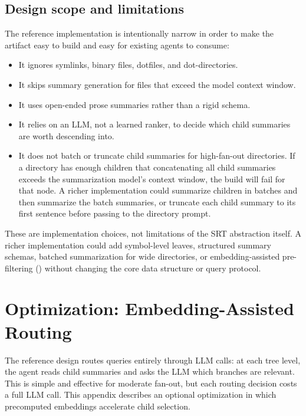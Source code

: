 \documentclass[11pt,a4paper]{article}
\newcommand{\srt}{\textsc{SRT}}
\begin{document}
\subsection{Design scope and limitations}\label{app:limits}

The reference implementation is intentionally narrow in order to make the artifact easy to build and easy for existing agents to consume:
\begin{itemize}[nosep]
    \item It ignores symlinks, binary files, dotfiles, and dot-directories.
    \item It skips summary generation for files that exceed the model context window.
    \item It uses open-ended prose summaries rather than a rigid schema.
    \item It relies on an LLM, not a learned ranker, to decide which child summaries are worth descending into.
    \item It does not batch or truncate child summaries for high-fan-out directories. If a directory has enough children that concatenating all child summaries exceeds the summarization model's context window, the build will fail for that node. A richer implementation could summarize children in batches and then summarize the batch summaries, or truncate each child summary to its first sentence before passing to the directory prompt.
\end{itemize}
These are implementation choices, not limitations of the \srt{} abstraction itself.
A richer implementation could add symbol-level leaves, structured summary schemas, batched summarization for wide directories, or embedding-assisted pre-filtering () without changing the core data structure or query protocol.


\section{Optimization: Embedding-Assisted Routing}\label{app:embeddings}

The reference design routes queries entirely through LLM calls: at each tree level, the agent reads child summaries and asks the LLM which branches are relevant. This is simple and effective for moderate fan-out, but each routing decision costs a full LLM call. This appendix describes an optional optimization in which precomputed embeddings accelerate child selection.
\end{document}

